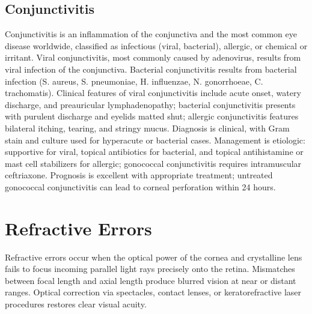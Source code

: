 \subsection{Conjunctivitis}
\label{sec:Conjunctivitis}
Conjunctivitis is an inflammation of the conjunctiva and the most common eye disease worldwide, classified as infectious (viral, bacterial), allergic, or chemical or irritant. Viral conjunctivitis, most commonly caused by adenovirus, results from viral infection of the conjunctiva. Bacterial conjunctivitis results from bacterial infection (S. aureus, S. pneumoniae, H. influenzae, N. gonorrhoeae, C. trachomatis). Clinical features of viral conjunctivitis include acute onset, watery discharge, and preauricular lymphadenopathy; bacterial conjunctivitis presents with purulent discharge and eyelids matted shut; allergic conjunctivitis features bilateral itching, tearing, and stringy mucus. Diagnosis is clinical, with Gram stain and culture used for hyperacute or bacterial cases. Management is etiologic: supportive for viral, topical antibiotics for bacterial, and topical antihistamine or mast cell stabilizers for allergic; gonococcal conjunctivitis requires intramuscular ceftriaxone. Prognosis is excellent with appropriate treatment; untreated gonococcal conjunctivitis can lead to corneal perforation within 24 hours.

\section{Refractive Errors}




Refractive errors occur when the optical power of the cornea and crystalline lens fails to focus incoming parallel light rays precisely onto the retina. Mismatches between focal length and axial length produce blurred vision at near or distant ranges. Optical correction via spectacles, contact lenses, or keratorefractive laser procedures restores clear visual acuity.



